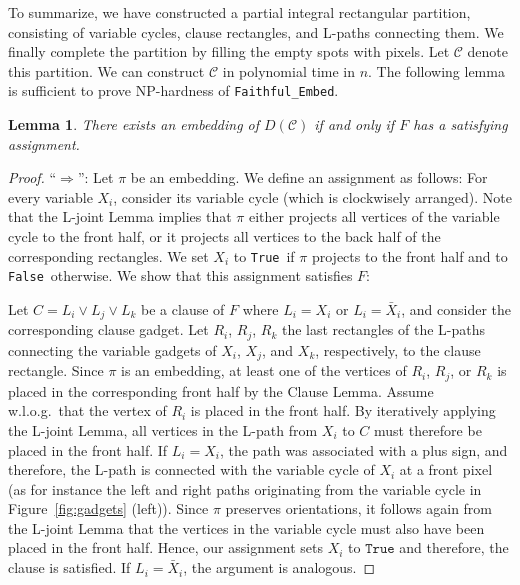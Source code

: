 \documentclass[12pt]{article}
\newcommand{\True}{\texttt{True}}
\newcommand{\False}{\texttt{False}}
\newcommand{\partition}{\mathcal{C}}
\newtheorem{lemma}[theorem]{Lemma}
\begin{document}
To summarize, we have constructed a partial integral rectangular partition, consisting of
variable cycles, clause rectangles, and L-paths connecting them. We finally 
complete the partition by filling the empty spots with pixels. Let $\partition$ denote
this partition. We can construct $\partition$ in polynomial time in $n$. The following lemma
is sufficient to prove NP-hardness of \texttt{Faithful\_Embed}.

\begin{lemma}\label{lem:sat_emb_equi}
There exists an embedding of $D(\partition)$ if and only if $F$ has a satisfying assignment.
\end{lemma}
\begin{proof}
``$\Rightarrow$'': Let $\pi$ be an embedding. We define an assignment as follows: For
every variable $X_i$, consider its variable cycle (which is clockwisely arranged).
Note that the L-joint Lemma implies that $\pi$ either projects all vertices
of the variable cycle to the front half, or it projects all vertices to the back half
of the corresponding rectangles. 
We set $X_i$ to \True\ if $\pi$ projects to the front half
and to \False\ otherwise. We show that this assignment satisfies $F$:

Let $C=L_i\vee L_j\vee L_k$ be a clause of $F$ where $L_i=X_i$ or $L_i=\bar{X}_i$,
and consider the corresponding clause gadget. Let $R_i$, $R_j$, $R_k$ the last rectangles
of the L-paths connecting the variable gadgets of $X_i$, $X_j$, and $X_k$, respectively,
to the clause rectangle. Since $\pi$ is an embedding, at least one of the vertices of $R_i$, $R_j$,
or $R_k$ is placed in the corresponding front half by the Clause Lemma.
Assume w.l.o.g.\ that the vertex of $R_i$ is placed in the front half. By iteratively applying
the L-joint Lemma,
all vertices in the L-path from $X_i$ to $C$ must therefore be placed in the front half.
If $L_i=X_i$, the path was associated with a plus sign, and therefore, the L-path is connected
with the variable cycle of $X_i$ at a front pixel 
(as for instance the left and right paths originating from
the variable cycle in Figure~\ref{fig:gadgets} (left)). Since $\pi$ preserves orientations, 
it follows again from the L-joint Lemma that the
vertices in the variable cycle must also have been placed in the front half. 
Hence, our assignment
sets $X_i$ to $\True$ and therefore, the clause is satisfied. If $L_i=\bar{X}_i$, 
the argument is analogous.


\end{proof}
\end{document}
